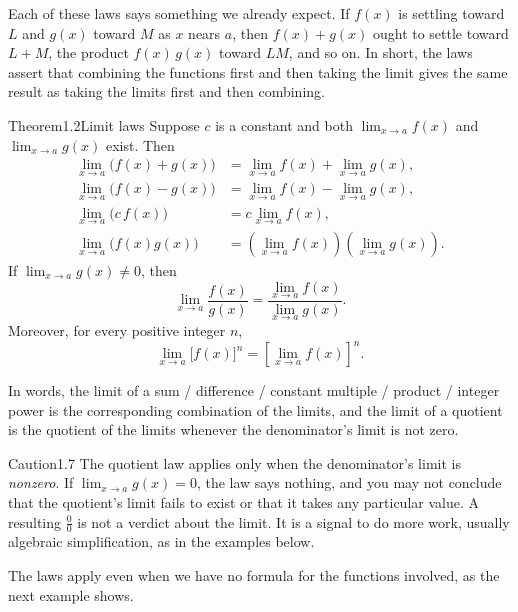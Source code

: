 \documentclass[a4paper,12pt,oneside]{memoir}
\begin{document}
Each of these laws says something we already expect. If \(f(x)\) is settling toward \(L\) and \(g(x)\) toward \(M\) as \(x\) nears \(a\), then \(f(x) + g(x)\) ought to settle toward \(L + M\), the product \(f(x)\,g(x)\) toward \(LM\), and so on. In short, the laws assert that combining the functions first and then taking the limit gives the same result as taking the limits first and then combining.

\begin{envtheorem}{Theorem}{1.2}{Limit laws}
Suppose \(c\) is a constant and both \(\lim_{x \to a} f(x)\) and \(\lim_{x \to a} g(x)\) exist. Then \[ \begin{aligned} \lim_{x \to a}\bigl(f(x) + g(x)\bigr) &= \lim_{x \to a} f(x) + \lim_{x \to a} g(x),\\ \lim_{x \to a}\bigl(f(x) - g(x)\bigr) &= \lim_{x \to a} f(x) - \lim_{x \to a} g(x),\\ \lim_{x \to a}\bigl(c \, f(x)\bigr) &= c \lim_{x \to a} f(x),\\ \lim_{x \to a}\bigl(f(x) g(x)\bigr) &= \left(\lim_{x \to a} f(x)\right)\!\left(\lim_{x \to a} g(x)\right). \end{aligned} \] If \(\lim_{x \to a} g(x) \neq 0\), then \[ \lim_{x \to a} \frac{f(x)}{g(x)} = \frac{\lim_{x \to a} f(x)}{\lim_{x \to a} g(x)}. \] Moreover, for every positive integer \(n\), \[ \lim_{x \to a} \bigl[f(x)\bigr]^{n} = \left[\lim_{x \to a} f(x)\right]^{n}. \]
\end{envtheorem}
In words, the limit of a sum / difference / constant multiple / product / integer power is the corresponding combination of the limits, and the limit of a quotient is the quotient of the limits whenever the denominator’s limit is not zero.

\begin{envcaution}{Caution}{1.7}{}
The quotient law applies only when the denominator’s limit is \emph{nonzero}. If \(\lim_{x \to a} g(x) = 0\), the law says nothing, and you may not conclude that the quotient’s limit fails to exist or that it takes any particular value. A resulting \(\tfrac{0}{0}\) is not a verdict about the limit. It is a signal to do more work, usually algebraic simplification, as in the examples below.
\end{envcaution}
The laws apply even when we have no formula for the functions involved, as the next example shows.
\end{document}
